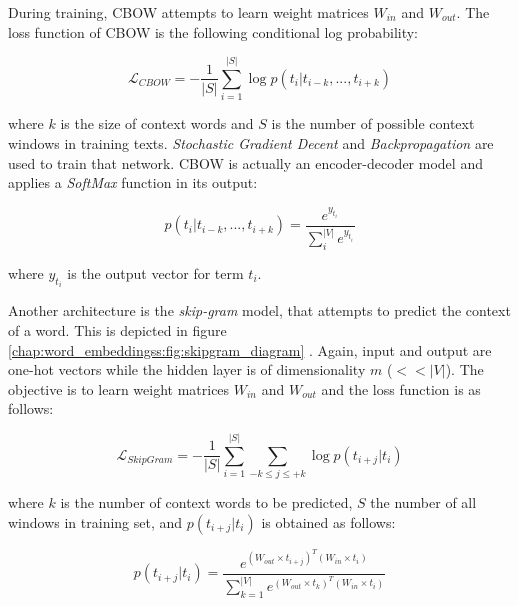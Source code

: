 During training, CBOW attempts to learn weight matrices $W_{in}$ and $W_{out}$. The loss function of CBOW is the following conditional log probability: 

\begin{equation} \label{chap:word_embeddings:eq:CBOW_log_likelihood}
	 \mathcal{L}_{CBOW} = -\frac{1}{|S|} \sum_{i=1}^{|S|}{\log{p(t_{i}|t_{i-k}, ... ,t_{i+k})}}
\end{equation}

\noindent
where $k$ is the size of context words and $S$ is the number of possible context windows in training texts. \textit{Stochastic Gradient Decent} and \textit{Backpropagation} are used to train that network. CBOW is actually an encoder-decoder model and applies a \textit{SoftMax} function in its output: 

\begin{equation} \label{chap:word_embeddings:eq:CBOW_softmax}
	p(t_{i}|t_{i-k},...,t_{i+k}) = \frac{e^{y_{t_{i}}}}{\sum^{|V|}_{i}{e^{y_{t_i}}}}
\end{equation}

\nointdent where $y_{t_i}$ is the output vector for term $t_i$.

Another architecture is the \textit{skip-gram} model, that attempts to predict the context of a word. This is depicted in figure \ref{chap:word_embeddingss:fig:skipgram_diagram} . Again, input and output are one-hot vectors while the hidden layer is of dimensionality $m$ ($<<|V|$). The objective is to learn weight matrices $W_{in}$ and $W_{out}$ and the loss function is as follows:

\begin{equation} \label{chap:word_embeddings:eq:skipgram_log_likelihood}
	 \mathcal{L}_{SkipGram} = -\frac{1}{|S|} \sum_{i=1}^{|S|}{ \sum_{-k \leq j \leq +k}{ \log {p(t_{i+j}|t_{i})}  } }
\end{equation}

\nointend where $k$ is the number of context words to be predicted, $S$ the number of all windows in training set, and $p(t_{i+j}|t_{i})$ is obtained as follows:

\begin{equation} \label{chap:word_embeddings:eq:skipgram_softmax}
	p(t_{i+j}|t_{i}) = \frac{ e^{(W_{out}  \times  t_{i+j})^{T} (W_{in} \times  t_{i})}}{\sum^{|V|}_{k=1}{ e^{(W_{out}  \times  t_{k})^{T} (W_{in} \times  t_{i})}}} 
\end{equation}

